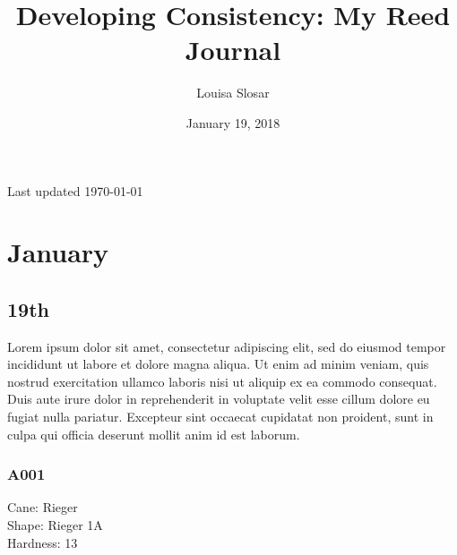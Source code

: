 \documentclass[a4paper,12pt]{memoir}
\title{Developing Consistency: My Reed Journal}
\author{Louisa Slosar}
\date{January 19, 2018}
\begin{document}
\frontmatter %

\begin{titlingpage}

\begin{center}

\maketitle

\vspace{15cm}

Last updated \today

\end{center}

\end{titlingpage}

\tableofcontents*

\listoffigures*

\mainmatter


\chapter{January}

\section{19th}

Lorem ipsum dolor sit amet, consectetur adipiscing elit, sed do eiusmod tempor incididunt ut labore et dolore magna aliqua. Ut enim ad minim veniam, quis nostrud exercitation ullamco laboris nisi ut aliquip ex ea commodo consequat. Duis aute irure dolor in reprehenderit in voluptate velit esse cillum dolore eu fugiat nulla pariatur. Excepteur sint occaecat cupidatat non proident, sunt in culpa qui officia deserunt mollit anim id est laborum.

\subsection{A001}
Cane: Rieger \\
Shape: Rieger 1A \\
Hardness: 13 \\
\end{document}
